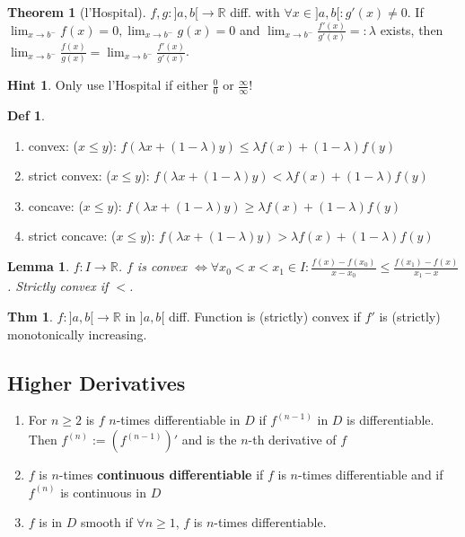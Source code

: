 \documentclass[a4paper, 10pt]{article}
\newtheorem*{lemma}{Lemma}
\theoremstyle{definition}
\newtheorem*{theorem}{Thm}
\newtheorem*{definition}{Def}
\newtheorem*{note_wrapper}{Hint}
\theoremstyle{named}
\newtheorem*{ntheorem_wrapper}{Theorem}
\newenvironment{ntheorem}%
    {\begin{mdframed}[style=important]\begin{ntheorem_wrapper}}%
    {\end{ntheorem_wrapper}\end{mdframed}}
\newenvironment{note}%
    {\begin{mdframed}[style=trick]\begin{note_wrapper}}%
    {\end{note_wrapper}\end{mdframed}}
\newcommand{\R}{\mathbb{R}}
\begin{document}
\begin{ntheorem}[l'Hospital]
    $f,g : ]a, b[ \to \R$ diff. with $\forall x \in ]a, b[ : g'(x) \neq 0$.
    If $\lim_{x \to b^-} f(x) = 0, \lim_{x \to b^-} g(x) = 0$ and $\lim_{x \to b^-} \frac{f'(x)}{g'(x)} =: \lambda$ exists, then $\lim_{x \to b^-}\frac{f(x)}{g(x)} = \lim_{x \to b^-}\frac{f'(x)}{g'(x)}$.
\end{ntheorem}

\begin{note}
    Only use l'Hospital if either $\frac{0}{0}$ or $\frac{\infty}{\infty}$!
\end{note}

\begin{definition}
    \begin{enumerate}
        \item convex: ($x \leq y$): $f (\lambda x + (1 - \lambda)y) \leq \lambda f(x) + (1 - \lambda)f(y)$
        \item strict convex: ($x \leq y$): $f (\lambda x + (1 - \lambda)y) < \lambda f(x) + (1 - \lambda)f(y)$
        \item concave: ($x \leq y$): $f (\lambda x + (1 - \lambda)y) \geq \lambda f(x) + (1 - \lambda)f(y)$
        \item strict concave: ($x \leq y$): $f (\lambda x + (1 - \lambda)y) > \lambda f(x) + (1 - \lambda)f(y)$
    \end{enumerate}
\end{definition}

\begin{lemma}
    $f: I \to \R$. $f$ is convex $\iff \forall x_0 < x < x_1 \in I: \frac{f(x) - f(x_0)}{x - x_0} \leq \frac{f(x_1) - f(x)}{x_1 - x}$. Strictly convex if $<$.
\end{lemma}

\begin{theorem}
    $f: ]a, b[ \to \R$ in $]a, b[$ diff. Function is (strictly) convex if $f'$ is (strictly) monotonically increasing.
\end{theorem}

\subsection{Higher Derivatives}
\begin{enumerate}
    \item For $n \geq 2$ is $f$ $n$-times differentiable in $D$ if $f^{(n-1)}$ in $D$ is differentiable. Then $f^{(n)} := (f^{(n-1)})'$ and is the $n$-th derivative of $f$
    \item $f$ is $n$-times \textbf{continuous differentiable} if $f$ is $n$-times differentiable and if $f^{(n)}$ is continuous in $D$
    \item $f$ is in $D$ smooth if $\forall n \geq 1$, $f$ is $n$-times differentiable.
\end{enumerate}
\end{document}
